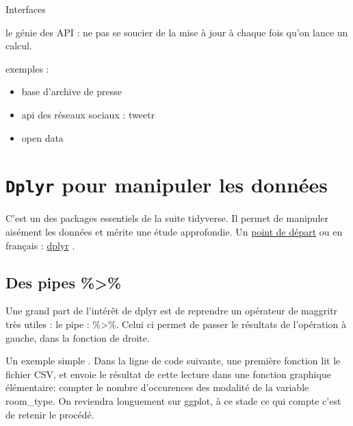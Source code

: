\documentclass[
]{book}
\newenvironment{Shaded}{\begin{snugshade}}{\end{snugshade}}
\newcommand{\DataTypeTok}[1]{\textcolor[rgb]{0.13,0.29,0.53}{#1}}
\newcommand{\KeywordTok}[1]{\textcolor[rgb]{0.13,0.29,0.53}{\textbf{#1}}}
\newcommand{\NormalTok}[1]{#1}
\newcommand{\OperatorTok}[1]{\textcolor[rgb]{0.81,0.36,0.00}{\textbf{#1}}}
\newcommand{\StringTok}[1]{\textcolor[rgb]{0.31,0.60,0.02}{#1}}
\providecommand{\tightlist}{%
  \setlength{\itemsep}{0pt}\setlength{\parskip}{0pt}}
\begin{document}
Interfaces

le génie des API : ne pas se soucier de la mise à jour à chaque fois qu'on lance un calcul.

exemples :

\begin{itemize}
\tightlist
\item
  base d'archive de presse
\item
  api des réseaux sociaux : tweetr
\item
  open data
\end{itemize}

\hypertarget{dplyr-pour-manipuler-les-donnuxe9es}{%
\section{\texorpdfstring{\texttt{Dplyr} pour manipuler les données}{Dplyr pour manipuler les données}}\label{dplyr-pour-manipuler-les-donnuxe9es}}

C'est un des packages essentiels de la suite tidyverse. Il permet de manipuler aisément les données et mérite une étude approfondie. Un \href{https://dplyr.tidyverse.org/articles/dplyr.html}{point de départ} ou en français : \href{http://larmarange.github.io/analyse-R/manipuler-les-donnees-avec-dplyr.html}{dplyr} .

\hypertarget{des-pipes}{%
\subsection{Des pipes \%\textgreater\%}\label{des-pipes}}

Une grand part de l'intérêt de dplyr est de reprendre un opérateur de maggritr très utiles : le pipe : \%\textgreater\%. Celui ci permet de passer le résultats de l'opération à gauche, dans la fonction de droite.

Un exemple simple . Dans la ligne de code suivante, une première fonction lit le fichier CSV, et envoie le résultat de cette lecture dans une fonction graphique élémentaire: compter le nombre d'occurences des modalité de la variable room\_type. On reviendra longuement sur ggplot, à ce stade ce qui compte c'est de retenir le procédé.

\begin{Shaded}
\end{Shaded}
\end{document}
